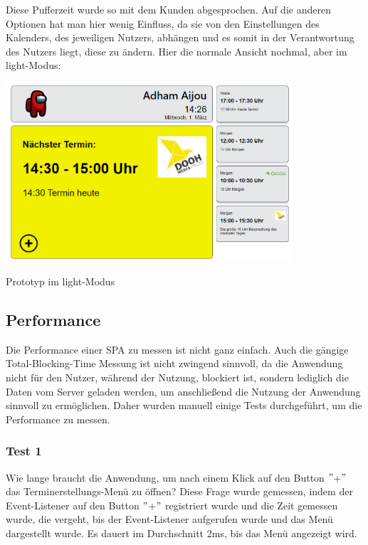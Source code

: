 Diese Pufferzeit wurde so mit dem Kunden abgesprochen.
Auf die anderen Optionen hat man hier wenig Einfluss, da sie von den Einstellungen des Kalenders, des jeweiligen Nutzers, abhängen und es somit in der Verantwortung des Nutzers liegt, diese zu ändern.
\newline
\newline
Hier die normale Ansicht nochmal, aber im light-Modus:
\par\vspace{1cm}
    \centering
    \includegraphics[width=0.8\textwidth]{Bilder/Ergebnis_lightMode}
    \caption{Prototyp im light-Modus}
    \label{fig:PrototypLight}
\par\vspace{1cm}
\raggedright
\newline
\newline
\subsection{Performance}\label{subsec:performance}
Die Performance einer \gls{SPA} zu messen ist nicht ganz einfach.
Auch die gängige Total-Blocking-Time Messung ist nicht zwingend sinnvoll, da die Anwendung nicht für den Nutzer, während der Nutzung, blockiert ist, sondern lediglich die Daten vom Server geladen werden, um anschließend die Nutzung der Anwendung sinnvoll zu ermöglichen.
Daher wurden manuell einige Tests durchgeführt, um die Performance zu messen.
\newline
\newline
\subsubsection{Test 1}\label{subsubsec:test-1}
\newline
\newline
Wie lange braucht die Anwendung, um nach einem Klick auf den Button \("\)+\("\) das Terminerstellungs-Menü zu öffnen?
Diese Frage wurde gemessen, indem der Event-Listener auf den Button \("\)+\("\) registriert wurde und die Zeit gemessen wurde, die vergeht, bis der Event-Listener aufgerufen wurde und das Menü dargestellt wurde.
Es dauert im Durchschnitt 2ms, bis das Menü angezeigt wird.
\newline
\newline
